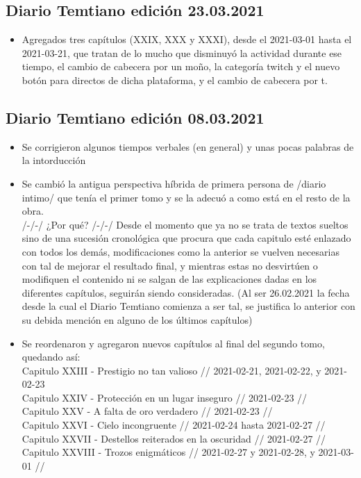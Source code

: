 \documentclass[
  spanish,
]{book}
\providecommand{\tightlist}{%
  \setlength{\itemsep}{0pt}\setlength{\parskip}{0pt}}
\begin{document}
\hypertarget{diario-temtiano-ediciuxf3n-23.03.2021}{%
\subsection*{Diario Temtiano edición 23.03.2021}\label{diario-temtiano-ediciuxf3n-23.03.2021}}

\begin{itemize}
\tightlist
\item[$\boxtimes$]
  Agregados tres capítulos (XXIX, XXX y XXXI), desde el 2021-03-01 hasta el 2021-03-21, que tratan de lo mucho que disminuyó la actividad durante ese tiempo, el cambio de cabecera por un moño, la categoría twitch y el nuevo botón para directos de dicha plataforma, y el cambio de cabecera por t.
\end{itemize}

\hypertarget{diario-temtiano-ediciuxf3n-08.03.2021}{%
\subsection*{Diario Temtiano edición 08.03.2021}\label{diario-temtiano-ediciuxf3n-08.03.2021}}

\begin{itemize}
\item
  Se corrigieron algunos tiempos verbales (en general) y unas pocas palabras de la intorducción
\item
  Se cambió la antigua perspectiva híbrida de primera persona de /diario intimo/ que tenía el primer tomo y se la adecuó a como está en el resto de la obra.~\\
  /-/-/ ¿Por qué? /-/-/ Desde el momento que ya no se trata de textos sueltos sino de una sucesión cronológica que procura que cada capitulo esté enlazado con todos los demás, modificaciones como la anterior se vuelven necesarias con tal de mejorar el resultado final, y mientras estas no desvirtúen o modifiquen el contenido ni se salgan de las explicaciones dadas en los diferentes capítulos, seguirán siendo consideradas. (Al ser 26.02.2021 la fecha desde la cual el Diario Temtiano comienza a ser tal, se justifica lo anterior con su debida mención en alguno de los últimos capítulos)
\item
  Se reordenaron y agregaron nuevos capítulos al final del segundo tomo, quedando así:~\\
  Capitulo XXIII - Prestigio no tan valioso // 2021-02-21, 2021-02-22, y 2021-02-23~\\
  Capitulo XXIV - Protección en un lugar inseguro // 2021-02-23 //~\\
  Capitulo XXV - A falta de oro verdadero // 2021-02-23 //~\\
  Capitulo XXVI - Cielo incongruente // 2021-02-24 hasta 2021-02-27 //~\\
  Capitulo XXVII - Destellos reiterados en la oscuridad // 2021-02-27 //~\\
  Capitulo XXVIII - Trozos enigmáticos // 2021-02-27 y 2021-02-28, y 2021-03-01 //
\end{itemize}
\end{document}
